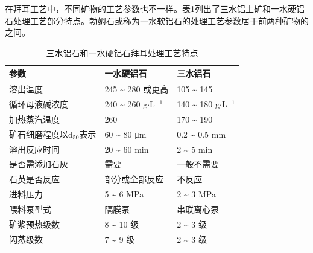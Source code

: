 在拜耳工艺中，不同矿物的工艺参数也不一样。表\ref{processforsanshuilushi}列出了三水铝土矿和一水硬铝石处理工艺部分特点\cite{bauxite1997bishiwen,qing2002yang}。勃姆石或称为一水软铝石的处理工艺参数居于前两种矿物的之间。
\begin{table}[!htbp]
	\centering
	\vspace{-10pt}
	\wu
	\begin{threeparttable}
		\caption{三水铝石和一水硬铝石拜耳处理工艺特点}\label{processforsanshuilushi}
		\begin{tabularx}{\linewidth}{XXX}%
			\toprule[1.5pt]
			参数&一水硬铝石&三水铝石\\\midrule
			溶出温度&245 \textasciitilde{ }280 \textcelsius 或更高&105 \textasciitilde{ }145 \textcelsius\\
			循环母液碱浓度&240 \textasciitilde{ }260 g$ \cdot $L$ ^{\mathrm{-1}} $&140 \textasciitilde{ }180 g$ \cdot $L$ ^{\mathrm{-1}} $\\
			加热蒸汽温度&260 \textcelsius&170 \textasciitilde{ }190 \textcelsius\\
			矿石细磨程度以d$ _{50} $表示&60 \textasciitilde{ }80 μm&0.2 \textasciitilde{ }0.5 mm\\
			溶出反应时间&20 \textasciitilde{ }60 min&2 \textasciitilde{ }5 min\\
			是否需添加石灰&需要&一般不需要\\
			石英是否反应&部分或全部反应&不反应\\
			进料压力&5 \textasciitilde{ }6 MPa&2 \textasciitilde{ }3 MPa\\
			喂料泵型式&隔膜泵&串联离心泵\\
			矿浆预热级数&8 \textasciitilde{ }10 级&2 \textasciitilde{ }3 级\\
			闪蒸级数&7 \textasciitilde{ }9 级&2 \textasciitilde{ }3 级\\
			\bottomrule[1.5pt]
		\end{tabularx}
	\end{threeparttable}
\end{table}

